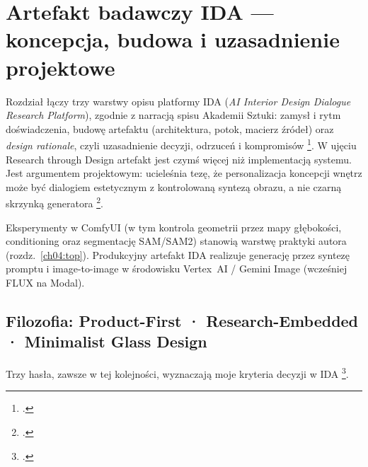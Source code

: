\chapter{Artefakt badawczy IDA --- koncepcja, budowa i uzasadnienie projektowe}
\label{ch07:top}

Rozdział łączy trzy warstwy opisu platformy IDA (\emph{AI Interior Design Dialogue Research Platform}), zgodnie z narracją spisu Akademii Sztuki: zamysł i rytm doświadczenia, budowę artefaktu (architektura, potok, macierz źródeł) oraz \emph{design rationale}, czyli uzasadnienie decyzji, odrzuceń i kompromisów \footcite{idaPlatform2026}.
W ujęciu Research through Design artefakt jest czymś więcej niż implementacją systemu. Jest argumentem projektowym: ucieleśnia tezę, że personalizacja koncepcji wnętrz może być dialogiem estetycznym z kontrolowaną syntezą obrazu, a nie czarną skrzynką generatora \footcite{zimmerman2007rtd,frayling1993research}.

Eksperymenty w ComfyUI (w tym kontrola geometrii przez mapy głębokości, conditioning oraz segmentację SAM/SAM2) stanowią warstwę praktyki autora (rozdz.~\ref{ch04:top}). Produkcyjny artefakt IDA realizuje generację przez syntezę promptu i image-to-image w środowisku Vertex~AI / Gemini Image (wcześniej FLUX na Modal).

\section{Filozofia: Product-First · Research-Embedded · Minimalist Glass Design}
\label{ch07:sec:filozofia}

Trzy hasła, zawsze w tej kolejności, wyznaczają moje kryteria decyzji w IDA \footcite{idaPlatform2026}.

